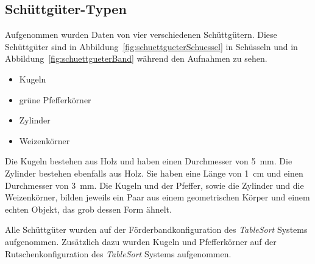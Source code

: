 

\subsection{Schüttgüter-Typen}

Aufgenommen wurden Daten von vier verschiedenen Schüttgütern.
Diese Schüttgüter sind in Abbildung~\ref{fig:schuettgueterSchuessel} in Schüsseln 
und in Abbildung~\ref{fig:schuettgueterBand} während den Aufnahmen zu sehen.


\begin{itemize}
    \item Kugeln
    \item grüne Pfefferkörner
    \item Zylinder
    \item Weizenkörner
\end{itemize}

Die Kugeln bestehen aus Holz und haben einen Durchmesser von \SI{5}{\milli\metre}.
Die Zylinder bestehen ebenfalls aus Holz. Sie haben eine Länge von \SI{1}{\centi\metre} und einen Durchmesser von \SI{3}{\milli\metre}.
Die Kugeln und der Pfeffer, sowie die Zylinder und die Weizenkörner, bilden jeweils 
ein Paar aus einem geometrischen Körper und einem echten Objekt, das grob dessen Form ähnelt.


Alle Schüttgüter wurden auf der Förderbandkonfiguration des \textit{TableSort} Systems aufgenommen.
Zusätzlich dazu wurden Kugeln und Pfefferkörner auf der Rutschenkonfiguration des \textit{TableSort} Systems aufgenommen.

